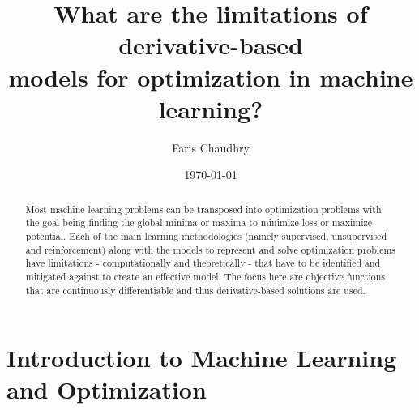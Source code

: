 \documentclass[10pt,a4paper]{report}
\title{What are the limitations of derivative-based \\
	   models for optimization in machine learning?}
\author{Faris Chaudhry}
\date{\today}
\newcommand\frontmatter{
	\cleardoublepage
	\pagenumbering{roman}}
\newcommand\mainmatter{
	\cleardoublepage
	\pagenumbering{arabic}}
\begin{document}
	\frontmatter
	\maketitle

	\begin{abstract}
		Most machine learning problems can be transposed into optimization problems
		with the goal being finding the global minima or maxima to minimize loss or maximize potential.
		Each of the main learning methodologies (namely supervised, unsupervised and reinforcement)
		along with the models to represent and solve optimization problems have limitations -
		computationally and theoretically - that have to be identified and mitigated against
		to create an effective model. The focus here are objective functions that are continuously differentiable
		and thus derivative-based solutions are used.
	\end{abstract}

	\tableofcontents
	\mainmatter

    \chapter{Introduction to Machine Learning and Optimization}
\end{document}
